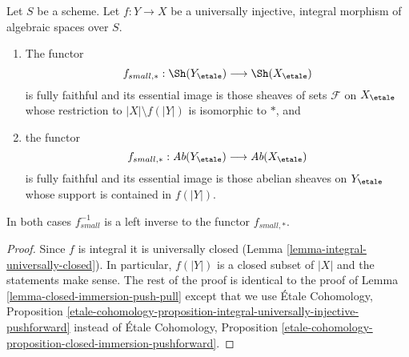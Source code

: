 \begin{lemma}
\label{lemma-integral-universally-injective-push-pull}
Let $S$ be a scheme. Let $f : Y \to X$ be a universally injective,
integral morphism of algebraic spaces over $S$.
\begin{enumerate}
\item The functor
$$
f_{small, *} : \Sh(Y_\etale) \longrightarrow \Sh(X_\etale)
$$
is fully faithful and its essential image is those sheaves of sets
$\mathcal{F}$ on $X_\etale$ whose restriction to $|X| \setminus f(|Y|)$
is isomorphic to $*$, and
\item the functor
$$
f_{small, *} : \textit{Ab}(Y_\etale) \longrightarrow \textit{Ab}(X_\etale)
$$
is fully faithful and its essential image is those abelian sheaves on
$Y_\etale$ whose support is contained in $f(|Y|)$.
\end{enumerate}
In both cases $f_{small}^{-1}$ is a left inverse to the functor $f_{small, *}$.
\end{lemma}

\begin{proof}
Since $f$ is integral it is universally closed
(Lemma \ref{lemma-integral-universally-closed}).
In particular, $f(|Y|)$ is a closed subset of $|X|$
and the statements make sense.
The rest of the proof is identical to the proof of
Lemma \ref{lemma-closed-immersion-push-pull}
except that we use
\'Etale Cohomology, Proposition
\ref{etale-cohomology-proposition-integral-universally-injective-pushforward}
instead of
\'Etale Cohomology, Proposition
\ref{etale-cohomology-proposition-closed-immersion-pushforward}.
\end{proof}





























